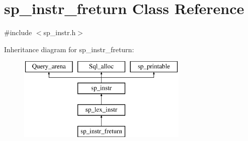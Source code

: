 \hypertarget{classsp__instr__freturn}{}\section{sp\+\_\+instr\+\_\+freturn Class Reference}
\label{classsp__instr__freturn}


{\ttfamily \#include $<$sp\+\_\+instr.\+h$>$}

Inheritance diagram for sp\+\_\+instr\+\_\+freturn\+:\begin{figure}[H]
\begin{center}
\leavevmode
\includegraphics[height=4.000000cm]{classsp__instr__freturn}
\end{center}
\end{figure}
